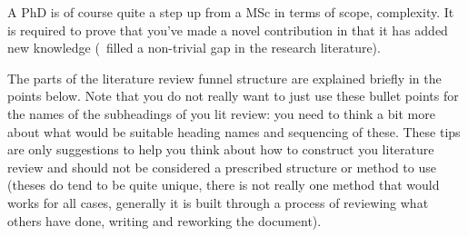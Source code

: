 A PhD is of course quite a step up from a MSc in terms of scope, complexity.  It is required to prove that you've made a novel contribution in that it has added new knowledge (\ie~filled a non-trivial gap in the research literature).

The parts of the literature review funnel structure are explained briefly in the points below.  Note that you do not really want to just use these bullet points for the names of the subheadings of you lit review: you need to think a bit more about what would be suitable heading names and sequencing of these.  These tips are only suggestions to help you think about how to construct you literature review and should not be considered a prescribed structure or method to use (theses do tend to be quite unique, there is not really one method that would works for all cases, generally it is built through a process of reviewing what others have done, writing and reworking the document).


